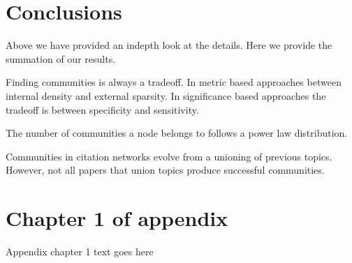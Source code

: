 \documentclass[phd,tocprelim]{cornell}
\begin{document}
\chapter{Conclusions}

Above we have provided an indepth look at the details.  Here we provide the summation of our results.

Finding communities is always a tradeoff.  In metric based approaches between internal density and external sparsity.  In significance based approaches the tradeoff is between specificity and sensitivity.

The number of communities a node belongs to follows a power law distribution.

Communities in citation networks evolve from a unioning of previous topics.  However, not all papers that union topics produce successful communities.


\appendix
\chapter{Chapter 1 of appendix}
Appendix chapter 1 text goes here


\end{document}
